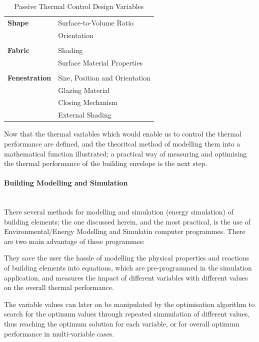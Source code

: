 \documentclass[11pt,a4paper,oneside]{article}
\begin{document}
\begin{multicols}{2}
\begin{table}[H]
	\centering
	\begin{tabular}{l|p{3.7cm}}
		\textbf{Shape}&Surface-to-Volume Ratio\\
		&Orientation\\
		&\\
		\textbf{Fabric}&Shading\\
		&Surface Material Properties\\
		&\\
		\textbf{Fenestration}&Size, Position and Orientation\\
		&Glazing Material\\
		&Closing Mechanism\\
		&External Shading\\
	\end{tabular}
	\caption{Passive Thermal Control Design Variables}
	\label{tab:ThermalDesignVariables}
\end{table}

Now that the thermal variables which would enable us to control the thermal performance are defined, and the theoritcal method of modelling them into a mathematical function illustrated; a practical way of measuring and optimising the thermal performance of the building envelope is the next step. 

\paragraph{Building Modelling and Simulation}\mbox{}\\

There several methods for modelling and simulation (energy simulation) of building elements; the one discussed herein, and the most practical, is the use of Environmental/Energy Modelling and Simulatin computer programmes. There are two main advantage of these programmes:
\begin{compactenum}
	\item They save the user the hassle of modelling the physical properties and reactions of building elements into equations, which are pre-programmed in the simulation application, and measures the impact of different variables with different values on the overall thermal performance.
	\item The variable values can later on be manipulated by the optimisation algorithm to search for the optimum values through repeated simmulation of different values, thus reaching the optimum solution for each variable, or for overall optimum performance in multi-variable cases.
\end{compactenum}


\end{multicols}
\end{document}
